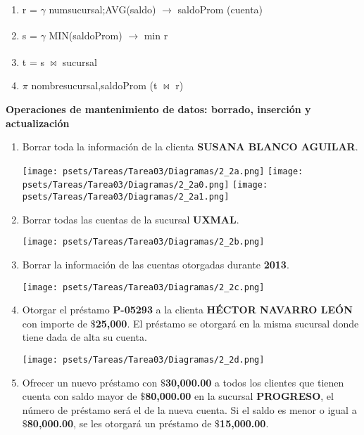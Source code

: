\documentclass[10pt,letterpaper,fleqn]{article}
\begin{document}
\begin{enumerate}
\begin{enumerate}[a]
            \begin{enumerate}[1]
                \item \textbar \quad r = $\gamma$ numsucursal;AVG(saldo) $\xrightarrow[]{}$ saldoProm (cuenta)
                \item \textbar \quad s = $\gamma$ MIN(saldoProm) $\xrightarrow[]{}$ min r
                \item \textbar \quad t = s $\bowtie$ sucursal
                \item \textbar \quad $\pi$ nombresucursal,saldoProm (t $\bowtie$ r)
            \end{enumerate}
        \end{enumerate}
        \textbf{Operaciones de mantenimiento de datos: borrado, inserción y actualización}
        \begin{enumerate}[a]
            \item Borrar toda la información de la clienta \textbf{SUSANA BLANCO AGUILAR}.
            \begin{center}
            \texttt{[image: psets/Tareas/Tarea03/Diagramas/2\_2a.png]}
            \texttt{[image: psets/Tareas/Tarea03/Diagramas/2\_2a0.png]}
            \texttt{[image: psets/Tareas/Tarea03/Diagramas/2\_2a1.png]}
            \end{center}
            \item Borrar todas las cuentas de la sucursal \textbf{UXMAL}.
            \begin{center}
            \texttt{[image: psets/Tareas/Tarea03/Diagramas/2\_2b.png]}
            \end{center}
            \item Borrar la información de las cuentas otorgadas durante \textbf{2013}.
            \begin{center}
            \texttt{[image: psets/Tareas/Tarea03/Diagramas/2\_2c.png]}
            \end{center}
            \item Otorgar el préstamo \textbf{P-05293} a la clienta \textbf{HÉCTOR NAVARRO LEÓN} con importe de $\$$\textbf{25,000}. El préstamo se otorgará en la misma sucursal donde tiene dada de alta su cuenta.
            \begin{center}
            \texttt{[image: psets/Tareas/Tarea03/Diagramas/2\_2d.png]}
            \end{center}
            \item Ofrecer un nuevo préstamo con $\$$\textbf{30,000.00} a todos los clientes que tienen cuenta con saldo mayor de $\$$\textbf{80,000.00} en la sucursal \textbf{PROGRESO}, el número de préstamo será el de la nueva cuenta. Si el saldo es menor o igual a $\$$\textbf{80,000.00}, se les otorgará un préstamo de $\$$\textbf{15,000.00}.\\

\end{enumerate}
\end{enumerate}
\end{document}
